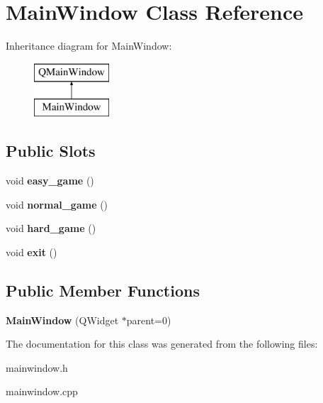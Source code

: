 \hypertarget{class_main_window}{}\section{Main\+Window Class Reference}
\label{class_main_window}
Inheritance diagram for Main\+Window\+:\begin{figure}[H]
\begin{center}
\leavevmode
\includegraphics[height=2.000000cm]{class_main_window}
\end{center}
\end{figure}
\subsection*{Public Slots}
\begin{DoxyCompactItemize}
\item 
void {\bfseries easy\+\_\+game} ()\hypertarget{class_main_window_a07a6590ba13449ba65f7c4be6a3908ef}{}\label{class_main_window_a07a6590ba13449ba65f7c4be6a3908ef}

\item 
void {\bfseries normal\+\_\+game} ()\hypertarget{class_main_window_ad99f37fbf0ed64c836a5e63db0edfb7b}{}\label{class_main_window_ad99f37fbf0ed64c836a5e63db0edfb7b}

\item 
void {\bfseries hard\+\_\+game} ()\hypertarget{class_main_window_ae33848e768caf3ebbef0c1461062741f}{}\label{class_main_window_ae33848e768caf3ebbef0c1461062741f}

\item 
void {\bfseries exit} ()\hypertarget{class_main_window_a627d7b538a0d60645e6c339bd787eeee}{}\label{class_main_window_a627d7b538a0d60645e6c339bd787eeee}

\end{DoxyCompactItemize}
\subsection*{Public Member Functions}
\begin{DoxyCompactItemize}
\item 
{\bfseries Main\+Window} (Q\+Widget $\ast$parent=0)\hypertarget{class_main_window_a8b244be8b7b7db1b08de2a2acb9409db}{}\label{class_main_window_a8b244be8b7b7db1b08de2a2acb9409db}

\end{DoxyCompactItemize}


The documentation for this class was generated from the following files\+:\begin{DoxyCompactItemize}
\item 
mainwindow.\+h\item 
mainwindow.\+cpp\end{DoxyCompactItemize}
